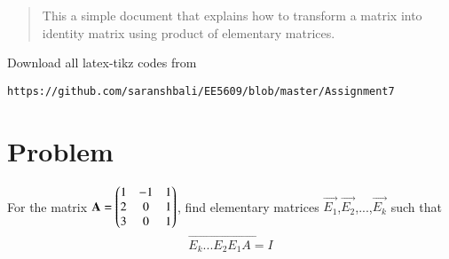 \documentclass[journal,12pt,twocolumn]{IEEEtran}
\begin{document}
%
\begin{abstract}
This a simple document that explains how to transform a matrix into identity matrix using product of elementary matrices.
\end{abstract}
%
%
Download all latex-tikz codes from 
%
\begin{lstlisting}
https://github.com/saranshbali/EE5609/blob/master/Assignment7
\end{lstlisting}
%
\section{Problem}
For the matrix $\mathbf{A}= \begin{pmatrix}1 & -1 & 1 \\ 2 & 0 & 1 \\ 3 & 0 & 1\end{pmatrix}$, find elementary matrices $\vec{E_1}$,$\vec{E_2}$,...,$\vec{E_k}$ such that
\begin{align}
	\vec{E_k...E_2E_1A = I}
\end{align}
\end{document}
